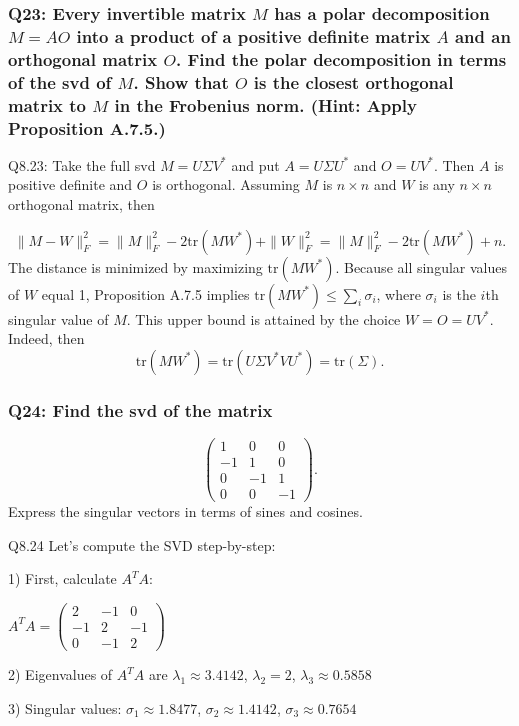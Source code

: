 \documentclass[8pt]{article}
\begin{document}
{{\subsubsection*{Q23: Every invertible matrix \( M \) has a polar decomposition \( M = AO \) into a product of a positive definite matrix \( A \) and an orthogonal matrix \( O \). Find the polar decomposition in terms of the svd of \( M \). Show that \( O \) is the closest orthogonal matrix to \( M \) in the Frobenius norm. (Hint: Apply Proposition A.7.5.)}

Q8.23: Take the full svd \( M = U \Sigma V^* \) and put \( A = U \Sigma U^* \) and \( O = UV^* \). Then \( A \) is positive definite and \( O \) is orthogonal. Assuming \( M \) is \( n \times n \) and \( W \) is any \( n \times n \) orthogonal matrix, then}
\[
\| M - W \|_F^2 = \| M \|_F^2 - 2 \text{tr}(MW^*) + \| W \|_F^2 = \| M \|_F^2 - 2 \text{tr}(MW^*) + n.
\]
\noindent The distance is minimized by maximizing \( \text{tr}(MW^*) \). Because all singular values of \( W \) equal 1, Proposition A.7.5 implies \( \text{tr}(MW^*) \leq \sum_i \sigma_i \), where \( \sigma_i \) is the \( i \)th singular value of \( M \). This upper bound is attained by the choice \( W = O = UV^* \). Indeed, then
\[
\text{tr}(MW^*) = \text{tr}(U \Sigma V^* V U^*) = \text{tr}(\Sigma).
\]

\subsubsection*{Q24: Find the svd of the matrix}
\[
\begin{pmatrix}
1 & 0 & 0 \\
-1 & 1 & 0 \\
0 & -1 & 1 \\
0 & 0 & -1
\end{pmatrix}.
\]
Express the singular vectors in terms of sines and cosines.

Q8.24 Let's compute the SVD step-by-step:

1) First, calculate $A^TA$:

   $A^TA = \begin{pmatrix}
   2 & -1 & 0 \\
   -1 & 2 & -1 \\
   0 & -1 & 2
   \end{pmatrix}$

2) Eigenvalues of $A^TA$ are $\lambda_1 \approx 3.4142$, $\lambda_2 = 2$, $\lambda_3 \approx 0.5858$

3) Singular values: $\sigma_1 \approx 1.8477$, $\sigma_2 \approx 1.4142$, $\sigma_3 \approx 0.7654$

}
\end{document}
